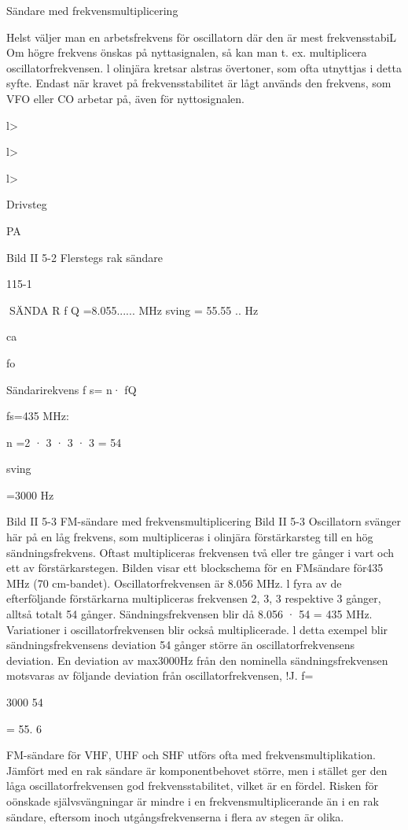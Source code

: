 \documentclass[a4paper,twoside,twocolumn,openright]{book}
\begin{document}
{{{Sändare med frekvensmultiplicering

Helst väljer man en arbetsfrekvens för oscillatorn där den är mest frekvensstabiL
Om högre frekvens önskas på nyttasignalen, så kan man t. ex. multiplicera
oscillatorfrekvensen. l olinjära kretsar alstras övertoner, som ofta utnyttjas i detta
syfte.
Endast när kravet på frekvensstabilitet är
lågt används den frekvens, som VFO eller
CO arbetar på, även för nyttosignalen.

l>

l>

l>

Drivsteg

PA

Bild II 5-2 Flerstegs rak sändare

115-1

SÄNDA R
f Q =8.055...... MHz
sving = 55.55 .. Hz

ca

fo

Sändarirekvens f s= n· fQ

fs=435 MHz:

n =2 · 3 · 3 · 3 = 54

sving

=3000 Hz

Bild II 5-3 FM-sändare med frekvensmultiplicering
Bild II 5-3
Oscillatorn svänger här på en låg frekvens,
som multipliceras i olinjära förstärkarsteg till
en hög sändningsfrekvens. Oftast multipliceras frekvensen två eller tre gånger i vart
och ett av förstärkarstegen.
Bilden visar ett blockschema för en FMsändare för435 MHz (70 cm-bandet). Oscillatorfrekvensen är 8.056 MHz. l fyra av de
efterföljande förstärkarna multipliceras frekvensen 2, 3, 3 respektive 3 gånger, alltså
totalt 54 gånger. Sändningsfrekvensen blir
då 8.056 · 54 = 435 MHz.
Variationer i oscillatorfrekvensen blir också multiplicerade. l detta exempel blir sändningsfrekvensens deviation 54 gånger större än oscillatorfrekvensens deviation. En
deviation av max3000Hz från den nominella sändningsfrekvensen motsvaras av följande deviation från oscillatorfrekvensen,
!J. f=

3000
54

= 55. 6

FM-sändare för VHF, UHF och SHF utförs ofta med frekvensmultiplikation. Jämfört med en rak sändare är komponentbehovet större, men i stället ger den låga oscillatorfrekvensen god frekvensstabilitet, vilket
är en fördel. Risken för oönskade självsvängningar är mindre i en frekvensmultiplicerande än i en rak sändare, eftersom inoch utgångsfrekvenserna i flera av stegen
är olika.

}}}
\end{document}
